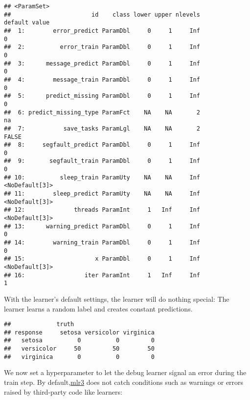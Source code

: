 \documentclass[
]{scrbook}
\newenvironment{Shaded}{\begin{snugshade}}{\end{snugshade}}
\newcommand{\FunctionTok}[1]{\textcolor[rgb]{0.00,0.00,0.00}{#1}}
\newcommand{\NormalTok}[1]{#1}
\newcommand{\OtherTok}[1]{\textcolor[rgb]{0.56,0.35,0.01}{#1}}
\newcommand{\SpecialCharTok}[1]{\textcolor[rgb]{0.00,0.00,0.00}{#1}}
\newcommand{\StringTok}[1]{\textcolor[rgb]{0.31,0.60,0.02}{#1}}
\renewenvironment{Shaded} {\begin{snugshade}\small} {\end{snugshade}}
\begin{document}
\begin{verbatim}
## <ParamSet>
##                       id    class lower upper nlevels        default value
##  1:        error_predict ParamDbl     0     1     Inf              0      
##  2:          error_train ParamDbl     0     1     Inf              0      
##  3:      message_predict ParamDbl     0     1     Inf              0      
##  4:        message_train ParamDbl     0     1     Inf              0      
##  5:      predict_missing ParamDbl     0     1     Inf              0      
##  6: predict_missing_type ParamFct    NA    NA       2             na      
##  7:           save_tasks ParamLgl    NA    NA       2          FALSE      
##  8:     segfault_predict ParamDbl     0     1     Inf              0      
##  9:       segfault_train ParamDbl     0     1     Inf              0      
## 10:          sleep_train ParamUty    NA    NA     Inf <NoDefault[3]>      
## 11:        sleep_predict ParamUty    NA    NA     Inf <NoDefault[3]>      
## 12:              threads ParamInt     1   Inf     Inf <NoDefault[3]>      
## 13:      warning_predict ParamDbl     0     1     Inf              0      
## 14:        warning_train ParamDbl     0     1     Inf              0      
## 15:                    x ParamDbl     0     1     Inf <NoDefault[3]>      
## 16:                 iter ParamInt     1   Inf     Inf              1
\end{verbatim}

With the learner's default settings, the learner will do nothing special: The learner learns a random label and creates constant predictions.

\begin{Shaded}
\end{Shaded}

\begin{verbatim}
##             truth
## response     setosa versicolor virginica
##   setosa          0          0         0
##   versicolor     50         50        50
##   virginica       0          0         0
\end{verbatim}

We now set a hyperparameter to let the debug learner signal an error during the train step.
By default,\href{https://github.com/mlr-org/mlr3}{mlr3} does not catch conditions such as warnings or errors raised by third-party code like learners:
\end{document}
